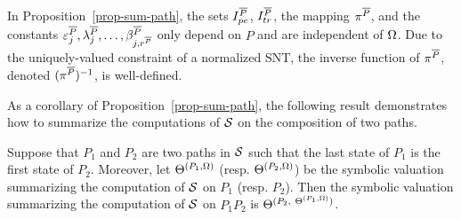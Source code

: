 In Proposition~\ref{prop-sum-path}, the sets $I^{\overline{P}}_{pe}$, $I^{\overline{P}}_{tr}$, the mapping $\pi^{\overline{P}}$, and the constants $\varepsilon^{\overline{P}}_j,\lambda^{\overline{P}}_j, \dots, \beta^{\overline{P}}_{j,r^{\overline{P}}}$ only depend on $P$ and are independent of $\Omega$. Due to the uniquely-valued constraint of a normalized SNT, the inverse function of $\pi^{\overline{P}}$, denoted $(\pi^{\overline{P}})^{-1}$, is well-defined.

As a corollary of Proposition~\ref{prop-sum-path}, the following result demonstrates how to summarize the computations of ${\mathcal{S} }$ on the composition of two paths.

\begin{corollary}\label{cor-comp-two-paths}
Suppose that $P_1$ and $P_2$ are two paths in ${\mathcal{S} }$ such that the last state of $P_1$ is the first state of $P_2$. Moreover, let $\Theta^{(P_1, \Omega)}$ (resp. $\Theta^{(P_2, \Omega)}$) be the symbolic valuation summarizing the computation of ${\mathcal{S} }$ on $P_1$ (resp. $P_2$). Then the symbolic valuation summarizing the computation of ${\mathcal{S} }$ on $P_1 P_2$ is $\sumf^{(P_2,\ \sumf^{(P_1,\initval)})}$.
\end{corollary}

